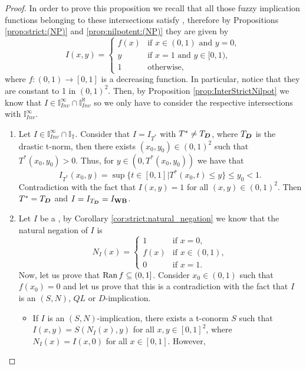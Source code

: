 \begin{proof} In order to prove this proposition we recall that all those fuzzy implication functions belonging to these intersections satisfy \NP, therefore by Propositions \ref{prop:strict:(NP)} and \ref{prop:nilpotent:(NP)} they are given by
	\begin{equation}\label{eq:(NP)2}
		I(x,y)
		=
		\left\{ \begin{array}{ll}
			f(x) &   \text{if }   x \in (0,1) \text{ and } y=0, \\
			y &   \text{if }   x=1 \text{ and } y \in [0,1), \\
			1 & \text{otherwise,}
		\end{array}
		\right.	
	\end{equation}
	where $f:(0,1) \to [0,1]$ is a decreasing function. In particular, notice that they are constant to 1 in $(0,1)^2$. Then, by Proposition \ref{prop:InterStrictNilpot} we know that $I \in  \mathbb{I}^{\infty}_{Inv} \cap \mathbb{I}^{\aleph}_{Inv}$ so we only have to consider the respective intersections with $\mathbb{I}^{\infty}_{Inv}$.
	\begin{enumerate}[label=(\roman*)]
		\item Let $I \in \mathbb{I}^{\infty}_{Inv} \cap \mathbb{I}_{\mathbb{T}}$.
		Consider that $I=I_{T^*}$ with $T^* \not = T_{\bm{D}}$, where $T_{\bm{D}}$ is the drastic t-norm, then there exists $(x_0,y_0) \in (0,1)^2$ such that $T^*(x_0,y_0)>0$. Thus, for $y \in (0,T^*(x_0,y_0))$ we have that
		$$I_{T^*}(x_0,y)=\sup\{t \in [0,1] | T^*(x_0,t) \leq y \} \leq y_0 < 1.$$
		Contradiction with the fact that  $I(x,y)=1$ for all $(x,y) \in (0,1)^2$. Then $T^*=T_{\bm{D}}$ and $I=I_{T_{\bm{D}}}=I_{\textbf{WB}}$.
		\item Let $I$ be a \STP, by Corollary \ref{cor:strict:natural_negation} we know that the natural negation of $I$ is
		$$N_I(x)= \left\{ \begin{array}{ll}
			1 &  \text{if }  x = 0, \\
			f(x) &  \text{if } x \in (0,1), \\
			0 & \text{if } x=1.
		\end{array}
		\right.
		$$
		Now, let us prove that $\operatorname{Ran} f \subseteq (0,1]$. Consider $x_0 \in (0,1)$ such that $f(x_0)=0$ and let us prove that this is a contradiction with the fact that $I$ is an $(S,N)$, $QL$ or $D$-implication.
		\begin{itemize}
			\item If $I$ is an $(S,N)$-implication, there exists a t-conorm $S$ such that $I(x,y)=S(N_I(x),y)$ for all $x,y \in [0,1]^2$, where $N_I(x)=I(x,0)$ for all $x\in[0,1]$. However,

\end{itemize}
\end{enumerate}
\end{proof}
